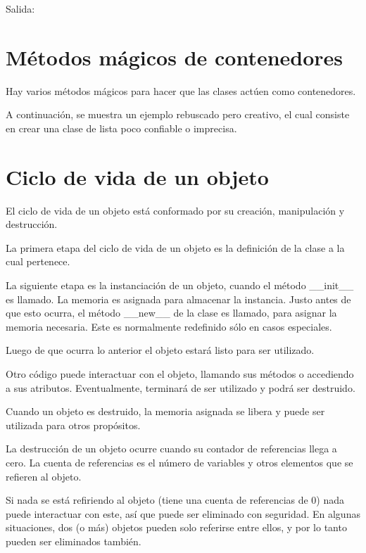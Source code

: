 \documentclass{report}
\newcommand{\out}[1]{Salida:\outfile{#1}}
\begin{document}
\out{codigo/20-objetos/gt.out}

\section{Métodos mágicos de contenedores}

Hay varios métodos mágicos para hacer que las clases actúen como contenedores.


A continuación, se muestra un ejemplo rebuscado pero creativo, el cual consiste en crear una clase de lista poco confiable o imprecisa.



\section{Ciclo de vida de un objeto}

El ciclo de vida de un objeto está conformado por su creación, manipulación y destrucción.\smallskip

La primera etapa del ciclo de vida de un objeto es la definición de la clase a la cual pertenece.\smallskip

La siguiente etapa es la instanciación de un objeto, cuando el método \_\_init\_\_ es llamado. La memoria es asignada para almacenar la instancia. Justo antes de que esto ocurra, el método \_\_new\_\_ de la clase es llamado, para asignar la memoria necesaria. Este es normalmente redefinido sólo en casos especiales.\smallskip

Luego de que ocurra lo anterior el objeto estará listo para ser utilizado.\smallskip

Otro código puede interactuar con el objeto, llamando sus métodos o accediendo a sus atributos. Eventualmente, terminará de ser utilizado y podrá ser destruido.\smallskip

Cuando un objeto es destruido, la memoria asignada se libera y puede ser utilizada para otros propósitos.\smallskip

La destrucción de un objeto ocurre cuando su contador de referencias llega a cero. La cuenta de referencias es el número de variables y otros elementos que se refieren al objeto.\smallskip

Si nada se está refiriendo al objeto (tiene una cuenta de referencias de 0) nada puede interactuar con este, así que puede ser eliminado con seguridad.
En algunas situaciones, dos (o más) objetos pueden solo referirse entre ellos, y por lo tanto pueden ser eliminados también.\smallskip
\end{document}
